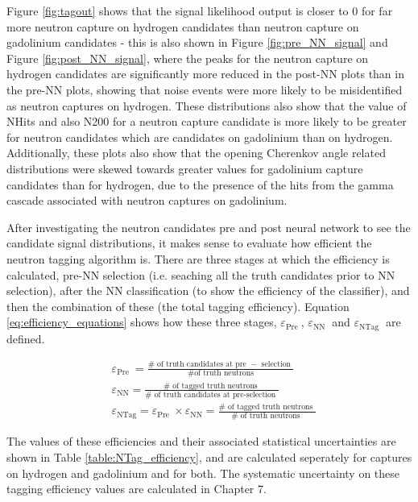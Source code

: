 Figure \ref{fig:tagout} shows that the signal likelihood output is closer to 0 for far more neutron capture on hydrogen candidates than neutron capture on gadolinium candidates - this is also shown in Figure \ref{fig:pre_NN_signal} and Figure \ref{fig:post_NN_signal}, where the peaks for the neutron capture on hydrogen candidates are significantly more reduced in the post-NN plots than in the pre-NN plots, showing that noise events were more likely to be misidentified as neutron captures on hydrogen. These distributions also show that the value of NHits and also N200 for a neutron capture candidate is more likely to be greater for neutron candidates which are candidates on gadolinium than on hydrogen. Additionally, these plots also show that the opening Cherenkov angle related distributions were skewed towards greater values for gadolinium capture candidates than for hydrogen, due to the presence of the hits from the gamma cascade associated with neutron captures on gadolinium. 

After investigating the neutron candidates pre and post neural network to see the candidate signal distributions, it makes sense to evaluate how efficient the neutron tagging algorithm is. There are three stages at which the efficiency is calculated, pre-NN selection (i.e. seaching all the truth candidates prior to NN selection), after the NN classification (to show the efficiency of the classifier), and then the combination of these (the total tagging efficiency). Equation \ref{eq:efficiency_equations} shows how these three stages, $\varepsilon_{\text {Pre }}$, $\varepsilon_{\text {NN }}$ and $\varepsilon_{\text {NTag }}$ are defined.

\begin{equation}
\begin{aligned}
    & \varepsilon_{\text {Pre }}=\frac{\# \text { of truth candidates at pre }-\text { selection }}{\# \text{of truth neutrons}} \\
    & \varepsilon_{\mathrm{NN}}=\frac{\# \text { of tagged truth neutrons }}{\# \text { of truth candidates at pre-selection }} \\
    & \varepsilon_{\mathrm{NTag}}=\varepsilon_{\text {Pre }} \times \varepsilon_{\mathrm{NN}}=\frac{\# \text { of tagged truth neutrons }}{\# \text { of truth neutrons }}
\end{aligned}
\label{eq:efficiency_equations}
\end{equation}

The values of these efficiencies and their associated statistical uncertainties are shown in Table \ref{table:NTag_efficiency}, and are calculated seperately for captures on hydrogen and gadolinium and for both. The systematic uncertainty on these tagging efficiency values are calculated in Chapter 7.

